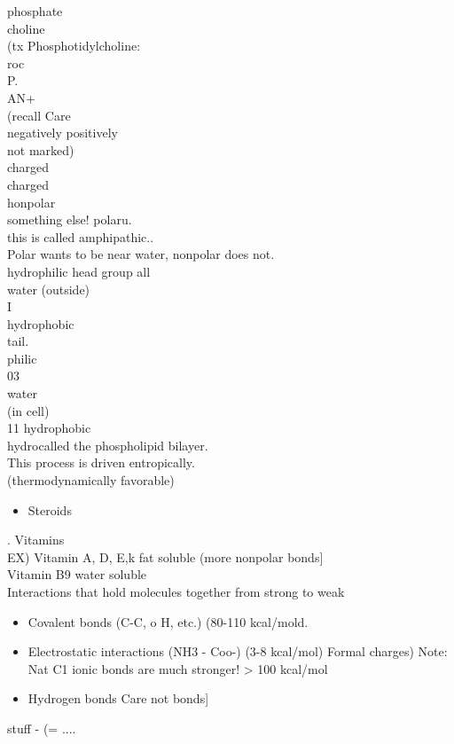 \documentclass{article}
\begin{document}
phosphate\\
choline\\
(tx Phosphotidylcholine:\\
roc\\
P.\\
AN+\\
(recall Care\\
negatively positively\\
not marked)\\
charged\\
charged\\
honpolar\\
something else! polaru.\\
this is called amphipathic..\\
Polar wants to be near water, nonpolar does not.\\
hydrophilic head group all\\
water (outside)\\
I\\
hydrophobic\\
tail.\\
philic\\
03\\
water\\
(in cell)\\
11 hydrophobic\\
hydrocalled the phospholipid bilayer.\\
This process is driven entropically.\\
(thermodynamically favorable)
\begin{itemize}
\item Steroids
\end{itemize}
. Vitamins\\
EX) Vitamin A, D, E,k fat soluble (more nonpolar bonds{]}\\
Vitamin B9 water soluble\\
Interactions that hold molecules together from strong to weak
\begin{itemize}
\item  Covalent bonds (C-C, o H, etc.) (80-110 kcal/mold.
\end{itemize}
\begin{itemize}
\item  Electrostatic interactions (NH3 - Coo-) (3-8 kcal/mol) Formal charges)
Note: Nat C1 ionic bonds are much stronger! > 100 kcal/mol
\item  Hydrogen bonds Care not bonds{]}
\end{itemize}
stuff - (= ....\\
\end{document}
